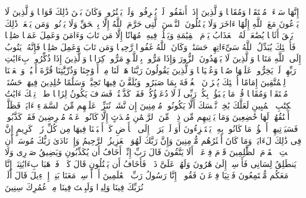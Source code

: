 \stopbuffer%
\startbuffer[\q:25:66]
إِنَّهَا سَاۤءَتۡ مُسۡتَقَرࣰّا وَمُقَامࣰا%
\stopbuffer%
\startbuffer[\q:25:67]
وَٱلَّذِینَ إِذَاۤ أَنفَقُوا۟ لَمۡ یُسۡرِفُوا۟ وَلَمۡ یَقۡتُرُوا۟ وَكَانَ بَیۡنَ ذَٰلِكَ قَوَامࣰا%
\stopbuffer%
\startbuffer[\q:25:68]
وَٱلَّذِینَ لَا یَدۡعُونَ مَعَ ٱللَّهِ إِلَٰهًا ءَاخَرَ وَلَا یَقۡتُلُونَ ٱلنَّفۡسَ ٱلَّتِی حَرَّمَ ٱللَّهُ إِلَّا بِٱلۡحَقِّ وَلَا یَزۡنُونَۚ وَمَن یَفۡعَلۡ ذَٰلِكَ یَلۡقَ أَثَامࣰا%
\stopbuffer%
\startbuffer[\q:25:69]
یُضَٰعَفۡ لَهُ ٱلۡعَذَابُ یَوۡمَ ٱلۡقِیَٰمَةِ وَیَخۡلُدۡ فِیهِۦ مُهَانًا%
\stopbuffer%
\startbuffer[\q:25:70]
إِلَّا مَن تَابَ وَءَامَنَ وَعَمِلَ عَمَلࣰا صَٰلِحࣰا فَأُو۟لَٰۤئِكَ یُبَدِّلُ ٱللَّهُ سَیِّءَاتِهِمۡ حَسَنَٰتࣲۗ وَكَانَ ٱللَّهُ غَفُورࣰا رَّحِیمࣰا%
\stopbuffer%
\startbuffer[\q:25:71]
وَمَن تَابَ وَعَمِلَ صَٰلِحࣰا فَإِنَّهُۥ یَتُوبُ إِلَى ٱللَّهِ مَتَابࣰا%
\stopbuffer%
\startbuffer[\q:25:72]
وَٱلَّذِینَ لَا یَشۡهَدُونَ ٱلزُّورَ وَإِذَا مَرُّوا۟ بِٱللَّغۡوِ مَرُّوا۟ كِرَامࣰا%
\stopbuffer%
\startbuffer[\q:25:73]
وَٱلَّذِینَ إِذَا ذُكِّرُوا۟ بِءَایَٰتِ رَبِّهِمۡ لَمۡ یَخِرُّوا۟ عَلَیۡهَا صُمࣰّا وَعُمۡیَانࣰا%
\stopbuffer%
\startbuffer[\q:25:74]
وَٱلَّذِینَ یَقُولُونَ رَبَّنَا هَبۡ لَنَا مِنۡ أَزۡوَٰجِنَا وَذُرِّیَّٰتِنَا قُرَّةَ أَعۡیُنࣲ وَٱجۡعَلۡنَا لِلۡمُتَّقِینَ إِمَامًا%
\stopbuffer%
\startbuffer[\q:25:75]
أُو۟لَٰۤئِكَ یُجۡزَوۡنَ ٱلۡغُرۡفَةَ بِمَا صَبَرُوا۟ وَیُلَقَّوۡنَ فِیهَا تَحِیَّةࣰ وَسَلَٰمًا%
\stopbuffer%
\startbuffer[\q:25:76]
خَٰلِدِینَ فِیهَاۚ حَسُنَتۡ مُسۡتَقَرࣰّا وَمُقَامࣰا%
\stopbuffer%
\startbuffer[\q:25:77]
قُلۡ مَا یَعۡبَؤُا۟ بِكُمۡ رَبِّی لَوۡلَا دُعَاۤؤُكُمۡۖ فَقَدۡ كَذَّبۡتُمۡ فَسَوۡفَ یَكُونُ لِزَامَۢا%
\stopbuffer%
\startbuffer[\q:26:1]
طسۤمۤ%
\stopbuffer%
\startbuffer[\q:26:2]
تِلۡكَ ءَایَٰتُ ٱلۡكِتَٰبِ ٱلۡمُبِینِ%
\stopbuffer%
\startbuffer[\q:26:3]
لَعَلَّكَ بَٰخِعࣱ نَّفۡسَكَ أَلَّا یَكُونُوا۟ مُؤۡمِنِینَ%
\stopbuffer%
\startbuffer[\q:26:4]
إِن نَّشَأۡ نُنَزِّلۡ عَلَیۡهِم مِّنَ ٱلسَّمَاۤءِ ءَایَةࣰ فَظَلَّتۡ أَعۡنَٰقُهُمۡ لَهَا خَٰضِعِینَ%
\stopbuffer%
\startbuffer[\q:26:5]
وَمَا یَأۡتِیهِم مِّن ذِكۡرࣲ مِّنَ ٱلرَّحۡمَٰنِ مُحۡدَثٍ إِلَّا كَانُوا۟ عَنۡهُ مُعۡرِضِینَ%
\stopbuffer%
\startbuffer[\q:26:6]
فَقَدۡ كَذَّبُوا۟ فَسَیَأۡتِیهِمۡ أَنۢبَٰۤؤُا۟ مَا كَانُوا۟ بِهِۦ یَسۡتَهۡزِءُونَ%
\stopbuffer%
\startbuffer[\q:26:7]
أَوَ لَمۡ یَرَوۡا۟ إِلَى ٱلۡأَرۡضِ كَمۡ أَنۢبَتۡنَا فِیهَا مِن كُلِّ زَوۡجࣲ كَرِیمٍ%
\stopbuffer%
\startbuffer[\q:26:8]
إِنَّ فِی ذَٰلِكَ لَءَایَةࣰۖ وَمَا كَانَ أَكۡثَرُهُم مُّؤۡمِنِینَ%
\stopbuffer%
\startbuffer[\q:26:9]
وَإِنَّ رَبَّكَ لَهُوَ ٱلۡعَزِیزُ ٱلرَّحِیمُ%
\stopbuffer%
\startbuffer[\q:26:10]
وَإِذۡ نَادَىٰ رَبُّكَ مُوسَىٰۤ أَنِ ٱئۡتِ ٱلۡقَوۡمَ ٱلظَّٰلِمِینَ%
\stopbuffer%
\startbuffer[\q:26:11]
قَوۡمَ فِرۡعَوۡنَۚ أَلَا یَتَّقُونَ%
\stopbuffer%
\startbuffer[\q:26:12]
قَالَ رَبِّ إِنِّیۤ أَخَافُ أَن یُكَذِّبُونِ%
\stopbuffer%
\startbuffer[\q:26:13]
وَیَضِیقُ صَدۡرِی وَلَا یَنطَلِقُ لِسَانِی فَأَرۡسِلۡ إِلَىٰ هَٰرُونَ%
\stopbuffer%
\startbuffer[\q:26:14]
وَلَهُمۡ عَلَیَّ ذَنۢبࣱ فَأَخَافُ أَن یَقۡتُلُونِ%
\stopbuffer%
\startbuffer[\q:26:15]
قَالَ كَلَّاۖ فَٱذۡهَبَا بِءَایَٰتِنَاۤۖ إِنَّا مَعَكُم مُّسۡتَمِعُونَ%
\stopbuffer%
\startbuffer[\q:26:16]
فَأۡتِیَا فِرۡعَوۡنَ فَقُولَاۤ إِنَّا رَسُولُ رَبِّ ٱلۡعَٰلَمِینَ%
\stopbuffer%
\startbuffer[\q:26:17]
أَنۡ أَرۡسِلۡ مَعَنَا بَنِیۤ إِسۡرَٰۤءِیلَ%
\stopbuffer%
\startbuffer[\q:26:18]
قَالَ أَلَمۡ نُرَبِّكَ فِینَا وَلِیدࣰا وَلَبِثۡتَ فِینَا مِنۡ عُمُرِكَ سِنِینَ%
\stopbuffer%
